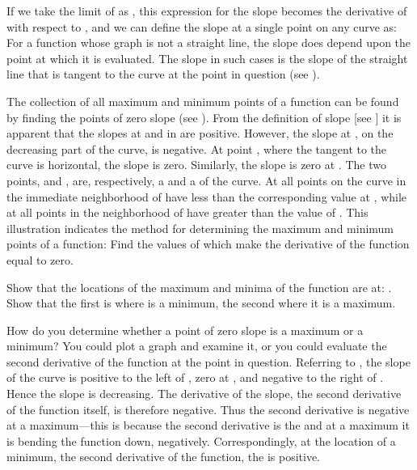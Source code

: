 {
If we take the limit of  as , this
expression for the slope
becomes the derivative of  with respect to , and we can define the
slope at a single point on any curve as:
%
%
For a function whose graph is not a straight line,
the slope does depend upon the point at which it is evaluated.
The slope in such cases is the slope of the straight line that is
tangent to the curve at the point in question (see ).

The collection of all maximum and minimum points of a
function can be found by finding the points of zero slope (see ).
From the definition of slope [see ] it is apparent that the
slopes at  and  in  are positive.
However, the slope at , on the decreasing part of the curve, is
negative.
At point , where the tangent to the curve is horizontal, the slope is
zero.
Similarly, the slope is zero at .
The two points,  and , are, respectively, a  and
a  of the curve.
At  all points on the curve in the immediate neighborhood of  have
 less than the corresponding value at , while at  all points
in the neighborhood of  have  greater than the value of .
This illustration indicates the method for determining the maximum and
minimum points of a function:
Find the values of  which make the derivative of the function equal to
zero.

\tryit Show that the locations of the maximum and minima of the function
%
%
are at: . 
Show that the first is where  is a minimum, the second where it is a
maximum.

How do you determine whether a point of zero slope is a maximum or a
minimum?
You could plot a graph and examine it, or you could evaluate the second
derivative of the function at the point in question.
Referring to , the slope of the curve is positive to the left of
, zero at , and negative to the right of .
Hence the slope is decreasing.
The derivative of the slope, the second derivative of the function 
itself, is therefore negative.
Thus the second derivative is negative at a maximum---this is because the
second derivative is the  and at a maximum it is bending
the function down, negatively.
Correspondingly, at the location of a minimum, the second derivative of the
function, the  is positive.

}

